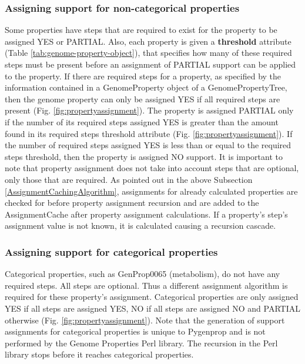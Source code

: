 \subsubsection{Assigning support for non-categorical properties}

Some properties have steps that are required to exist for the property to be assigned YES or PARTIAL. Also, each property is given a \textbf{threshold} attribute (Table \ref{tab:genome-property-object}), that specifies how many of these required steps must be present before an assignment of PARTIAL support can be applied to the property. If there are required steps for a property, as specified by the information contained in a GenomeProperty object of a GenomePropertyTree, then the genome property can only be assigned YES if all required steps are present (Fig. \ref{fig:propertyassignment}). The property is assigned PARTIAL only if the number of its required steps assigned YES is greater than the amount found in its required steps threshold attribute (Fig. \ref{fig:propertyassignment}). If the number of required steps assigned YES is less than or equal to the required steps threshold, then the property is assigned NO support. It is important to note that property assignment does not take into account steps that are optional, only those that are required. As pointed out in the above Subsection \ref{AssignmentCachingAlgorithm}, assignments for already calculated properties are checked for before property assignment recursion and are added to the AssignmentCache after property assignment calculations. If a property's step's assignment value is not known, it is calculated causing a recursion cascade.


\subsubsection{Assigning support for categorical properties}

Categorical properties, such as GenProp0065 (metabolism), do not have any required steps. All steps are optional. Thus a different assignment algorithm is required for these property's assignment. Categorical properties are only assigned YES if all steps are assigned YES, NO if all steps are assigned NO and PARTIAL otherwise (Fig. \ref{fig:propertyassignment}). Note that the generation of support assignments for categorical properties is unique to Pygenprop and is not performed by the Genome Properties Perl library. The recursion in the Perl library stops before it reaches categorical properties.

